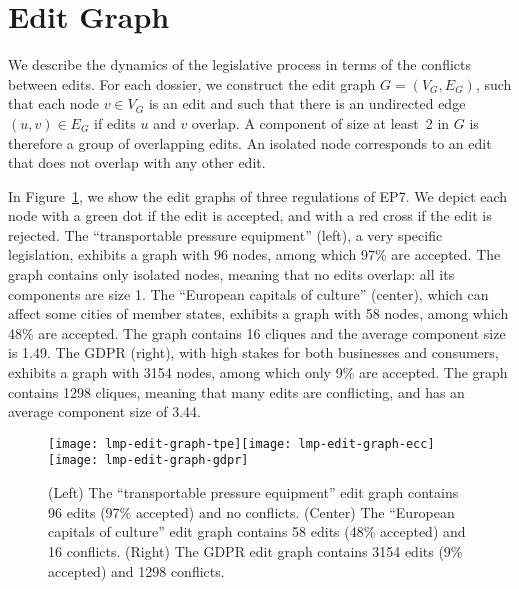 \section{Edit Graph}
\label{lmp:sec:collconf}

We describe the dynamics of the legislative process in terms of the conflicts between edits.
For each dossier, we construct the edit graph $ G = (V_G, E_G) $, such that each node $ v \in V_G $ is an edit and such that there is an undirected edge $ (u, v) \in E_G $ if edits $u$ and $v$ overlap.
A component of size at least~2 in $G$ is therefore a group of overlapping edits. %
An isolated node corresponds to an edit that does not overlap with any other edit.

In Figure~\ref{lmp:fig:edit_graph}, we show the edit graphs of three regulations of EP7.
We depict each node with a green dot if the edit is accepted, and with a red cross if the edit is rejected.
The ``transportable pressure equipment'' (left), a very specific legislation, exhibits a graph with 96 nodes, among which 97\% are accepted.
The graph contains only isolated nodes, meaning that no edits overlap: all its components are size 1.
The ``European capitals of culture'' (center), which can affect some cities of member states, exhibits a graph with 58 nodes, among which 48\% are accepted.
The graph contains 16 cliques and the average component size is 1.49.
The GDPR (right), with high stakes for both businesses and consumers, exhibits a graph with 3154 nodes, among which only 9\% are accepted.
The graph contains 1298 cliques, meaning that many edits are conflicting, and has an average component size of 3.44.

\begin{figure}
  \centering
	\newcommand{\imgscale}{0.88}
	\texttt{[image: lmp-edit-graph-tpe]}\hfill\texttt{[image: lmp-edit-graph-ecc]}\hfill\texttt{[image: lmp-edit-graph-gdpr]}
	\caption{
		(Left) The ``transportable pressure equipment'' edit graph contains 96 edits (97\% accepted) and no conflicts.
		(Center) The ``European capitals of culture'' edit graph contains 58 edits (48\% accepted) and 16 conflicts.
		(Right) The GDPR edit graph contains 3154 edits (9\% accepted) and 1298 conflicts.
	}
	\label{lmp:fig:edit_graph}
\end{figure}

